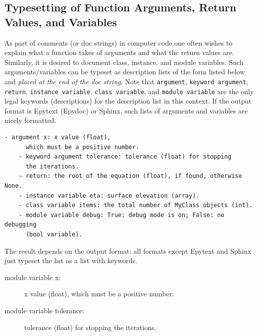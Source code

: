 \documentclass{article}
\begin{document}
\subsection{Typesetting of Function Arguments, Return Values, and Variables}

As part of comments (or doc strings) in computer code one often wishes
to explain what a function takes of arguments and what the return
values are. Similarly, it is desired to document class, instance, and
module variables.  Such arguments/variables can be typeset as
description lists of the form listed below and \emph{placed at the end of
the doc string}. Note that {\fontsize{10pt}{10pt}\verb!argument!}, {\fontsize{10pt}{10pt}\verb!keyword argument!}, {\fontsize{10pt}{10pt}\verb!return!},
{\fontsize{10pt}{10pt}\verb!instance variable!}, {\fontsize{10pt}{10pt}\verb!class variable!}, and {\fontsize{10pt}{10pt}\verb!module variable!} are the
only legal keywords (descriptions) for the description list in this
context.  If the output format is Epytext (Epydoc) or Sphinx, such lists of
arguments and variables are nicely formatted. 
\begin{Verbatim}[fontsize=\fontsize{9pt}{9pt},tabsize=8,baselinestretch=0.85,
fontfamily=tt,xleftmargin=7mm]
    - argument x: x value (float),
      which must be a positive number.
    - keyword argument tolerance: tolerance (float) for stopping
      the iterations.
    - return: the root of the equation (float), if found, otherwise None.
    - instance variable eta: surface elevation (array).
    - class variable items: the total number of MyClass objects (int).
    - module variable debug: True: debug mode is on; False: no debugging 
      (bool variable).
\end{Verbatim}
\noindent

The result depends on the output format: all formats except Epytext 
and Sphinx just typeset the list as a list with keywords.

\begin{description}
    \item[module variable x:] 
      x value (float),
      which must be a positive number.

    \item[module variable tolerance:] 
      tolerance (float) for stopping
      the iterations.
\end{description}

\noindent



\printindex
\end{document}
